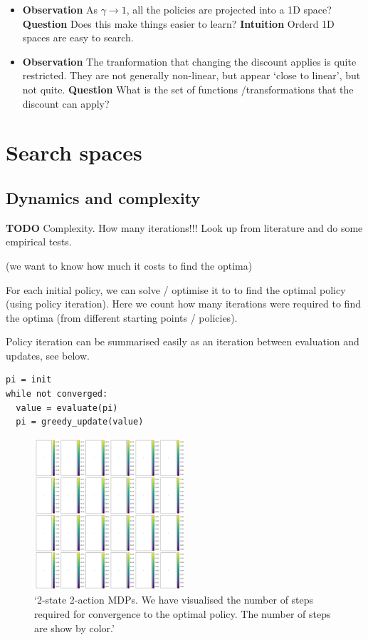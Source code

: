\begin{itemize}
\item
  \textbf{Observation} As \(\gamma \to 1\), all the policies are
  projected into a 1D space? \textbf{Question} Does this make things
  easier to learn? \textbf{Intuition} Orderd 1D spaces are easy to
  search.
\item
  \textbf{Observation} The tranformation that changing the discount
  applies is quite restricted. They are not generally non-linear, but
  appear `close to linear', but not quite. \textbf{Question} What is the
  set of functions /transformations that the discount can apply?
\end{itemize}


\section{Search spaces}
\subsection{Dynamics and complexity}

\textbf{TODO} Complexity. How many iterations!!! Look up from literature
and do some empirical tests.

(we want to know how much it costs to find the optima)

For each initial policy, we can solve / optimise it to to find the
optimal policy (using policy iteration). Here we count how many
iterations were required to find the optima (from different starting
points / policies).

Policy iteration can be summarised easily as an iteration between
evaluation and updates, see below.

\begin{verbatim}
pi = init
while not converged:
  value = evaluate(pi)
  pi = greedy_update(value)
\end{verbatim}

\begin{figure}
\centering
\includegraphics[width=0.5\textwidth,height=0.5\textheight]{../../pictures/figures/gpi-partitions.png}
\caption{`2-state 2-action MDPs. We have visualised the number of steps
required for convergence to the optimal policy. The number of steps are
show by color.'}
\end{figure}

